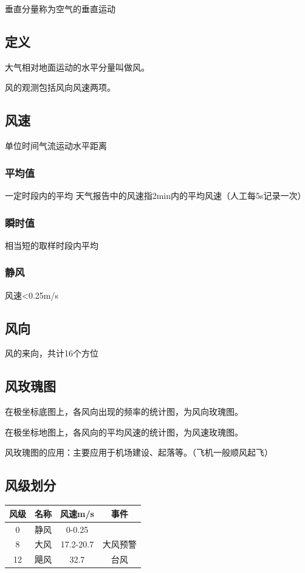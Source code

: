 \documentclass[UTF8,11pt]{ctexbook}
\begin{document}
垂直分量称为空气的垂直运动

\subsection{定义}

大气相对地面运动的水平分量叫做风。

风的观测包括风向风速两项。

\subsection{风速}

单位时间气流运动水平距离

\subsubsection{平均值}

一定时段内的平均
天气报告中的风速指2min内的平均风速（人工每5s记录一次）

\subsubsection{瞬时值}

相当短的取样时段内平均

\subsubsection{静风}

风速<0.25m/s

\subsection{风向}

风的来向，共计16个方位

\subsection{风玫瑰图}

在极坐标底图上，各风向出现的频率的统计图，为风向玫瑰图。

在极坐标地图上，各风向的平均风速的统计图，为风速玫瑰图。

风玫瑰图的应用：主要应用于机场建设、起落等。（飞机一般顺风起飞）


\subsection{风级划分}
\begin{table}[htbp]
    \centering
    \begin{tabular}{cccc}
        \toprule
        风级 & 名称 & 风速m/s & 事件\\
        \midrule
        0 & 静风 & 0-0.25 & \\
        8 & 大风 & 17.2-20.7 & 大风预警\\
        12 & 飓风 & 32.7 & 台风\\
        \bottomrule
    \end{tabular}
\end{table}
\end{document}
